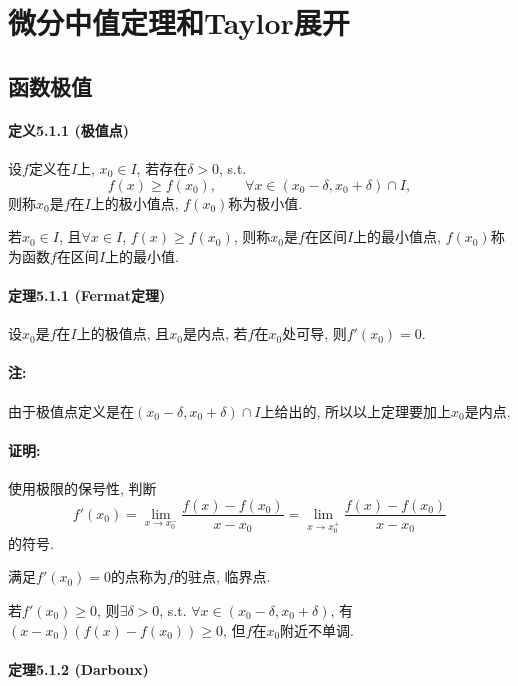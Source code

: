 
\section{微分中值定理和Taylor展开}

\subsection{函数极值}

\paragraph{定义5.1.1 (极值点)}

设$f$定义在$I$上, $x_{0}\in I$, 若存在$\delta>0$, s.t.
\[
f(x)\ge f(x_{0}),\qquad\forall x\in(x_{0}-\delta,x_{0}+\delta)\cap I,
\]
则称$x_{0}$是$f$在$I$上的极小值点, $f(x_{0})$称为极小值.

若$x_{0}\in I$, 且$\forall x\in I$, $f(x)\ge f(x_{0})$, 则称$x_{0}$是$f$在区间$I$上的最小值点,
$f(x_{0})$称为函数$f$在区间$I$上的最小值.

\paragraph{定理5.1.1 (Fermat定理)}

设$x_{0}$是$f$在$I$上的极值点, 且$x_{0}$是内点, 若$f$在$x_{0}$处可导, 则$f'(x_{0})=0$.

\paragraph{注:}

由于极值点定义是在$(x_{0}-\delta,x_{0}+\delta)\cap I$上给出的, 所以以上定理要加上$x_{0}$是内点.

\paragraph{证明:}

使用极限的保号性, 判断
\[
f'(x_{0})=\lim_{x\to x_{0}^{-}}\frac{f(x)-f(x_{0})}{x-x_{0}}=\lim_{x\to x_{0}^{+}}\frac{f(x)-f(x_{0})}{x-x_{0}}
\]
的符号.

满足$f'(x_{0})=0$的点称为$f$的驻点, 临界点.

若$f'(x_{0})\ge0$, 则$\exists\delta>0$, s.t. $\forall x\in(x_{0}-\delta,x_{0}+\delta)$,
有$(x-x_{0})(f(x)-f(x_{0}))\ge0$, 但$f$在$x_{0}$附近不单调.

\paragraph{定理5.1.2 (Darboux)}

